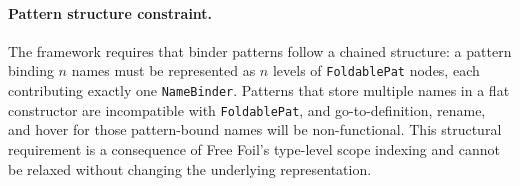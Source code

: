 \paragraph{Pattern structure constraint.}
The framework requires that binder patterns follow a chained structure: a pattern binding $n$ names must be represented as $n$ levels of \texttt{FoldablePat} nodes, each contributing exactly one \texttt{NameBinder}.
Patterns that store multiple names in a flat constructor are incompatible with \texttt{FoldablePat}, and go-to-definition, rename, and hover for those pattern-bound names will be non-functional.
This structural requirement is a consequence of Free Foil's type-level scope indexing and cannot be relaxed without changing the underlying representation.
